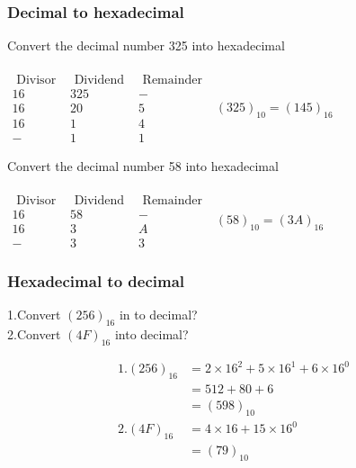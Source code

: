 \subsubsection{Decimal to hexadecimal}
\begin{exercise}
	Convert the decimal number 325 into hexadecimal\\\\
	$\begin{array}{ccc}\text { Divisor } & \text { Dividend } & \text { Remainder } \\  16 & 325 & - \\ 16 & 20 & 5 \\ 16 & 1 & 4 \\  - & 1 & 1  \end{array}$\qquad
	$(325)_{10}=(145)_{16}$
\end{exercise}
\begin{exercise}
	Convert the decimal number 58 into hexadecimal\\\\
	$\begin{array}{ccc}\text { Divisor } & \text { Dividend } & \text { Remainder } \\  16 & 58 & - \\ 16 & 3 & A \\ - & 3 & 3  \end{array}$\qquad
	$(58)_{10}=(3A)_{16}$
\end{exercise}


\subsubsection{Hexadecimal to decimal}

\begin{exercise}$\left. \right. $\\
	1.Convert $\left( 256\right) _{16}$ in to decimal?\\
	2.Convert $\left( 4F\right) _{16 }$ into decimal?
\end{exercise}
\begin{answer}
	\begin{align*}
	1.\left( 256\right) _{16}&=2\times 16^2+5\times 16^1+6\times 16^0\\
	&=512+80+6\\&=\left( 598\right) _{10}\\
	2.\left( 4F\right) _{16 }&=4\times 16 +15 \times 16^0\\&=\left( 79\right) _{10}
	\end{align*}
	
\end{answer}
